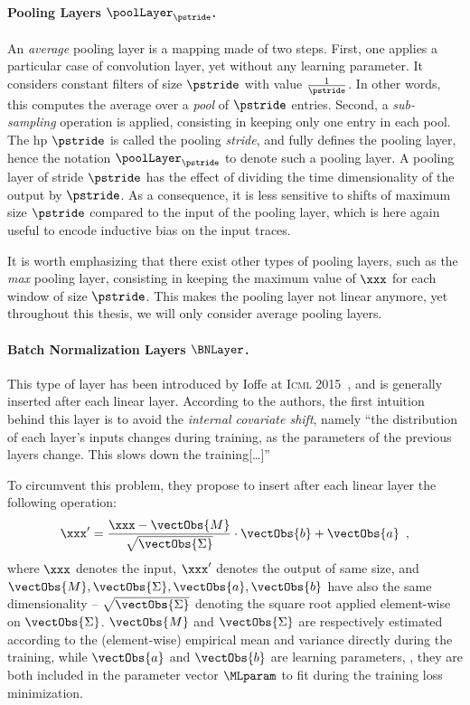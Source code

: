 \paragraph{Pooling Layers \(\poolLayer_\pstride\).}
An \emph{average} pooling layer is a mapping made of two steps.
First, one applies a particular case of convolution layer, yet without any learning parameter.
It considers constant filters of size \(\pstride\) with value \(\frac{1}{\pstride}\).
In other words, this computes the average over a \emph{pool} of \(\pstride\) entries.
Second, a \emph{sub-sampling} operation is applied, consisting in keeping only one entry in each pool.
The \gls{hp} \(\pstride\) is called the pooling \emph{stride}, and fully defines the pooling layer, hence the notation \(\poolLayer_\pstride\) to denote such a pooling layer.
A pooling layer of stride \(\pstride\) has the effect of dividing the time dimensionality of the output by \(\pstride\).
As a consequence, it is less sensitive to shifts of maximum size \(\pstride\) compared to the input of the pooling layer, which is here again useful to encode inductive bias on the input traces.

It is worth emphasizing that there exist other types of pooling layers, such as the \emph{max} pooling layer, consisting in keeping the maximum value of \(\xxx\) for each window of size \(\pstride\).
This makes the pooling layer not linear anymore, yet throughout this thesis, we will only consider average pooling layers.

\paragraph{Batch Normalization Layers \(\BNLayer\).}
This type of layer has been introduced by Ioffe \etal{} at \textsc{Icml} 2015~\cite{ioffe_batch_2015}, and is generally inserted after each linear layer.
According to the authors, the first intuition behind this layer is to avoid the \emph{internal covariate shift}, namely
``the distribution of each layer’s inputs changes during training, as the parameters of the previous layers change.
This slows down the training[\ldots]''

To circumvent this problem, they propose to insert after each linear layer the following operation:
\begin{equation}
	\xxx' = \frac{\xxx - \vectObs{M}}{\sqrt{\vectObs{\Sigma}}} \cdot \vectObs{b} + \vectObs{a} \enspace ,
\end{equation}
where \(\xxx\) denotes the input, \(\xxx'\) denotes the output of same size, and \(\vectObs{M}, \vectObs{\Sigma}, \vectObs{a}, \vectObs{b}\) have also the same dimensionality -- \(\sqrt{\vectObs{\Sigma}}\) denoting the square root applied element-wise on \(\vectObs{\Sigma}\).
\(\vectObs{M}\) and \(\vectObs{\Sigma}\) are respectively estimated according to the (element-wise) empirical mean and variance directly during the training, while \(\vectObs{a}\) and \(\vectObs{b}\) are learning parameters, \ie{}, they are both included in the parameter vector \(\MLparam\) to fit during the training loss minimization.

